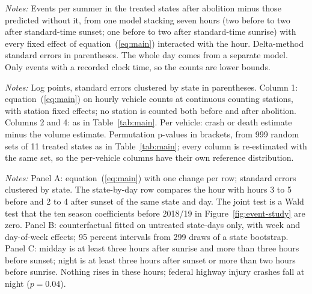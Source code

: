 \documentclass[12pt]{article}
\newcommand{\tabdir}{../analysis/output/tables}
\newcommand{\tabnote}[1]{\begin{tablenotes}[flushleft]\footnotesize\item \textit{Notes:} #1\end{tablenotes}}
\begin{document}
\begin{table}[p]
  \centering
  \caption{Excess events per summer after abolition}
  \label{tab:excess}
  \begin{threeparttable}
    \small
    
    \tabnote{Events per summer in the treated states after abolition minus
    those predicted without it, from one model stacking seven hours (two
    before to two after standard-time sunset; one before to two after
    standard-time sunrise) with
    every fixed effect of equation~(\ref{eq:main}) interacted with the hour.
    Delta-method standard errors in parentheses. The whole day comes from a
    separate model. Only events with a recorded clock time, so the counts
    are lower bounds.}
  \end{threeparttable}
\end{table}

\begin{table}[p]
  \centering
  \caption{Traffic volume and risk per vehicle on federal highways}
  \label{tab:volume}
  \begin{threeparttable}
    \small
    
    \tabnote{Log points, standard errors clustered by state in parentheses.
    Column 1: equation~(\ref{eq:main}) on hourly vehicle counts at continuous
    counting stations, with station fixed effects; no station is counted both
    before and after abolition. Columns 2 and 4: as in Table~\ref{tab:main}.
    Per vehicle: crash or death estimate minus the volume estimate.
    Permutation p-values in brackets, from 999 random sets of 11 treated
    states as in Table~\ref{tab:main}; every column is re-estimated with the
    same set, so the per-vehicle columns have their own reference
    distribution.}
  \end{threeparttable}
\end{table}

\begin{table}[p]
  \centering
  \caption{The hour after sunset under other choices, and hours whose light did not change}
  \label{tab:robustness}
  \begin{threeparttable}
    \small\setlength{\tabcolsep}{5pt}
    
    \tabnote{Panel A: equation~(\ref{eq:main}) with one change per row;
    standard errors clustered by state. The state-by-day row compares the hour
    with hours 3 to 5 before and 2 to 4 after sunset of the same state and
    day. The joint test is a Wald test that the
    ten season coefficients before 2018/19 in Figure~\ref{fig:event-study} are
    zero. Panel B: counterfactual fitted on untreated state-days only, with
    week and day-of-week effects; 95 percent intervals from 299 draws of a
    state bootstrap. Panel C: midday is at least three hours after sunrise
    and more than three hours before sunset; night is at least three hours
    after sunset or more than two hours before sunrise. Nothing rises in
    these hours; federal highway injury crashes fall at night ($p = 0.04$).}
  \end{threeparttable}
\end{table}
\end{document}
